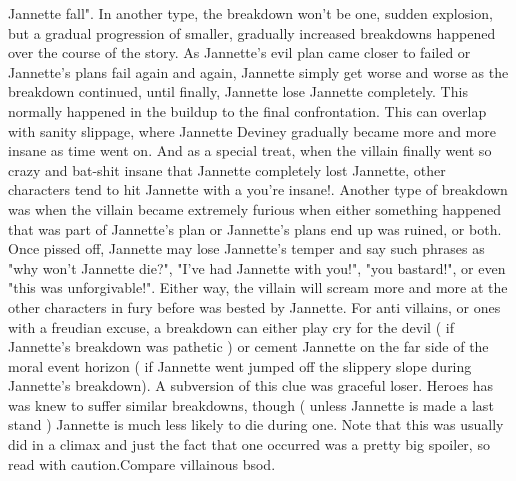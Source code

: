 \documentclass[12pt]{book}
\begin{document}
Jannette fall". In another type, the breakdown won't be one, sudden explosion, but a gradual progression of smaller, gradually increased breakdowns happened over the course of the story. As Jannette's evil plan came closer to failed or Jannette's plans fail again and again, Jannette simply get worse and worse as the breakdown continued, until finally, Jannette lose Jannette completely. This normally happened in the buildup to the final confrontation. This can overlap with sanity slippage, where Jannette Deviney gradually became more and more insane as time went on. And as a special treat, when the villain finally went so crazy and bat-shit insane that Jannette completely lost Jannette, other characters tend to hit Jannette with a you're insane!. Another type of breakdown was when the villain became extremely furious when either something happened that was part of Jannette's plan or Jannette's plans end up was ruined, or both. Once pissed off, Jannette may lose Jannette's temper and say such phrases as "why won't Jannette die?", "I've had Jannette with you!", "you bastard!", or even "this was unforgivable!". Either way, the villain will scream more and more at the other characters in fury before was bested by Jannette. For anti villains, or ones with a freudian excuse, a breakdown can either play cry for the devil ( if Jannette's breakdown was pathetic ) or cement Jannette on the far side of the moral event horizon ( if Jannette went jumped off the slippery slope during Jannette's breakdown). A subversion of this clue was graceful loser. Heroes has was knew to suffer similar breakdowns, though ( unless Jannette is made a last stand ) Jannette is much less likely to die during one. Note that this was usually did in a climax and just the fact that one occurred was a pretty big spoiler, so read with caution.Compare villainous bsod.
\end{document}
